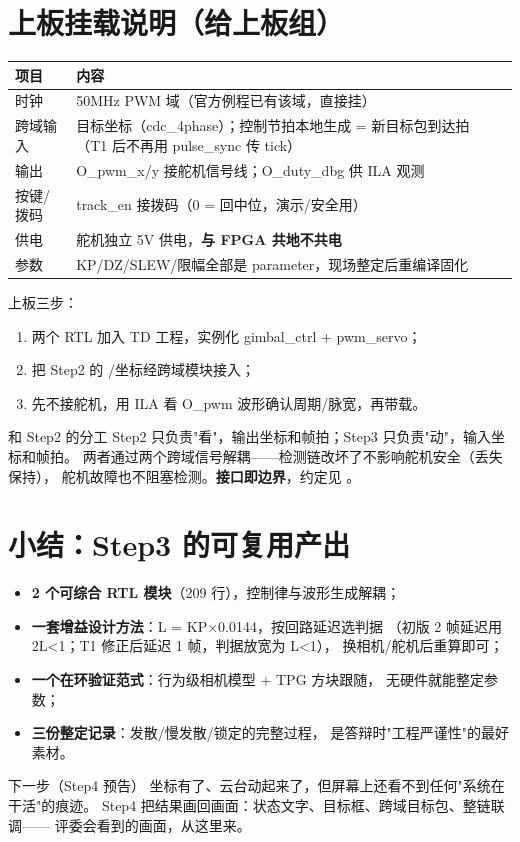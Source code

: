 \section{上板挂载说明（给上板组）}

\begin{center}
\begin{tabular}{ll}
\toprule
\rowcolor{rowtint}\textbf{项目} & \textbf{内容} \\
\midrule
时钟 & 50MHz PWM 域（官方例程已有该域，直接挂） \\
跨域输入 & 目标坐标（cdc\_4phase）；控制节拍本地生成 = 新目标包到达拍
（T1 后不再用 pulse\_sync 传 tick） \\
输出 & O\_pwm\_x/y 接舵机信号线；O\_duty\_dbg 供 ILA 观测 \\
按键/拨码 & track\_en 接拨码（0 = 回中位，演示/安全用） \\
供电 & 舵机独立 5V 供电，\textbf{与 FPGA 共地不共电} \\
参数 & KP/DZ/SLEW/限幅全部是 parameter，现场整定后重编译固化 \\
\bottomrule
\end{tabular}
\end{center}

上板三步：
\begin{enumerate}
  \item 两个 RTL 加入 TD 工程，实例化 gimbal\_ctrl + pwm\_servo；
  \item 把 Step2 的 /坐标经跨域模块接入；
  \item 先不接舵机，用 ILA 看 O\_pwm 波形确认周期/脉宽，再带载。
\end{enumerate}

\begin{tipbox}{和 Step2 的分工}
Step2 只负责"看"，输出坐标和帧拍；Step3 只负责"动"，输入坐标和帧拍。
两者通过两个跨域信号解耦——检测链改坏了不影响舵机安全（丢失保持），
舵机故障也不阻塞检测。\textbf{接口即边界}，约定见 。
\end{tipbox}

\section{小结：Step3 的可复用产出}

\begin{itemize}
  \item \textbf{2 个可综合 RTL 模块}（209 行），控制律与波形生成解耦；
  \item \textbf{一套增益设计方法}：L = KP×0.0144，按回路延迟选判据
    （初版 2 帧延迟用 2L<1；T1 修正后延迟 1 帧，判据放宽为 L<1），
    换相机/舵机后重算即可；
  \item \textbf{一个在环验证范式}：行为级相机模型 + TPG 方块跟随，
    无硬件就能整定参数；
  \item \textbf{三份整定记录}：发散/慢发散/锁定的完整过程，
    是答辩时"工程严谨性"的最好素材。
\end{itemize}

\begin{okbox}{下一步（Step4 预告）}
坐标有了、云台动起来了，但屏幕上还看不到任何"系统在干活"的痕迹。
Step4 把结果画回画面：状态文字、目标框、跨域目标包、整链联调——
评委会看到的画面，从这里来。
\end{okbox}

